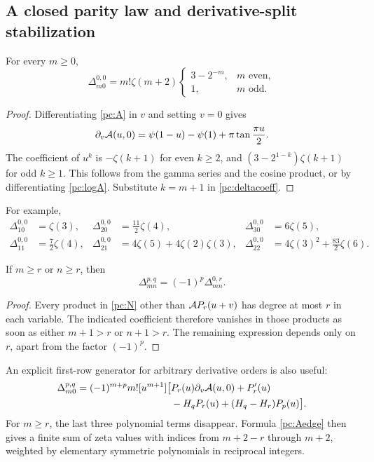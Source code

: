 \subsection{A closed parity law and derivative-split stabilization}
\begin{corollary}\label{pc:edge}
For every $m\ge0$,
\begin{equation}\label{pc:edgeformula}
 \Delta_{m0}^{0,0}=m!\zeta(m+2)
 \begin{cases}
 3-2^{-m},&m\text{ even},\\
 1,&m\text{ odd}.
 \end{cases}
\end{equation}
\end{corollary}
\begin{proof}
Differentiating \eqref{pc:A} in $v$ and setting $v=0$ gives
\begin{equation}\label{pc:Aedge}
 \partial_v\mathcal A(u,0)=\psi(1-u)-\psi(1)+\pi\tan\frac{\pi u}{2}.
\end{equation}
The coefficient of $u^k$ is $-\zeta(k+1)$ for even $k\ge2$, and
$(3-2^{1-k})\zeta(k+1)$ for odd $k\ge1$. This follows from the gamma series and the cosine product, or by differentiating \eqref{pc:logA}. Substitute $k=m+1$ in \eqref{pc:deltacoeff}.
\end{proof}
For example,
\begin{align*}
 \Delta_{10}^{0,0}&=\zeta(3),&
 \Delta_{20}^{0,0}&=\tfrac{11}{2}\zeta(4),&
 \Delta_{30}^{0,0}&=6\zeta(5),\\
 \Delta_{11}^{0,0}&=\tfrac72\zeta(4),&
 \Delta_{21}^{0,0}&=4\zeta(5)+4\zeta(2)\zeta(3),&
 \Delta_{22}^{0,0}&=4\zeta(3)^2+\tfrac{83}{2}\zeta(6).
\end{align*}

\begin{corollary}\label{pc:stabilization}
If $m\ge r$ or $n\ge r$, then
\begin{equation}\label{pc:stabilizationformula}
 \Delta_{mn}^{p,q}=(-1)^p\Delta_{mn}^{0,r}.
\end{equation}
\end{corollary}
\begin{proof}
Every product in \eqref{pc:N} other than $\mathcal A P_r(u+v)$ has degree at most $r$ in each variable. The indicated coefficient therefore vanishes in those products as soon as either $m+1>r$ or $n+1>r$. The remaining expression depends only on $r$, apart from the factor $(-1)^p$.
\end{proof}
An explicit first-row generator for arbitrary derivative orders is also useful:
\begin{align}\label{pc:general-edge}
 \Delta_{m0}^{p,q}=(-1)^{m+p}m![u^{m+1}]\bigl[
 &P_r(u)\partial_v\mathcal A(u,0)+P_r'(u)\notag\\
 &-H_qP_r(u)+(H_q-H_r)P_p(u)\bigr].
\end{align}
For $m\ge r$, the last three polynomial terms disappear. Formula \eqref{pc:Aedge} then gives a finite sum of zeta values with indices from $m+2-r$ through $m+2$, weighted by elementary symmetric polynomials in reciprocal integers.

